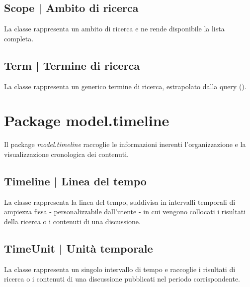 \documentclass[10pt,a4paper,headinclude,footinclude,hidelinks]{scrreprt} %
\begin{document}
	\subsection[Scope]{Scope | Ambito di ricerca}
	\label{sec:stage:design:sistema:model.search:search-scope}
	La classe \textit{} rappresenta un ambito di ricerca e ne rende disponibile la lista completa.

	\subsection[Term]{Term | Termine di ricerca}
	\label{sec:stage:design:sistema:model.search:search-term}
	La classe \textit{} rappresenta un generico termine di ricerca, estrapolato dalla query (\textit{}).

	\section{Package model.timeline}
	\label{sec:stage:design:sistema:model.timeline}
	Il package \textit{model.timeline} raccoglie le informazioni inerenti l'organizzazione e la visualizzazione cronologica dei contenuti.

	\subsection[Timeline]{Timeline | Linea del tempo}
	\label{sec:stage:design:sistema:model.timeline:timeline}
	La classe \textit{} rappresenta la linea del tempo, suddivisa in intervalli temporali \textit{} di ampiezza fissa - personalizzabile dall'utente - in cui vengono collocati i risultati della ricerca o i contenuti di una discussione.

	\subsection[TimeUnit]{TimeUnit | Unità temporale}
	\label{sec:stage:design:sistema:model.timeline:time-unit}
	La classe \textit{} rappresenta un singolo intervallo di tempo e raccoglie i risultati di ricerca o i contenuti di una discussione pubblicati nel periodo corrispondente.
\end{document}

